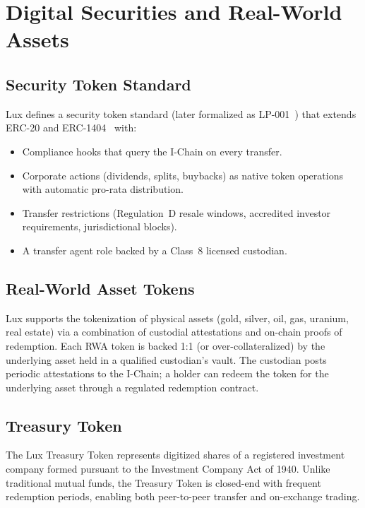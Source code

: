 \section{Digital Securities and Real-World Assets}


\subsection{Security Token Standard}

Lux defines a security token standard (later formalized as
LP-001~\cite{lp-001-securities}) that extends ERC-20 and
ERC-1404~\cite{erc1404} with:

\begin{itemize}[nosep]
  \item Compliance hooks that query the I-Chain on every transfer.
  \item Corporate actions (dividends, splits, buybacks) as native
        token operations with automatic pro-rata distribution.
  \item Transfer restrictions (Regulation~D resale windows, accredited
        investor requirements, jurisdictional blocks).
  \item A transfer agent role backed by a Class~8 licensed custodian.
\end{itemize}

\subsection{Real-World Asset Tokens}

Lux supports the tokenization of physical assets (gold, silver, oil,
gas, uranium, real estate) via a combination of custodial attestations
and on-chain proofs of redemption. Each RWA token is backed 1:1 (or
over-collateralized) by the underlying asset held in a qualified
custodian's vault. The custodian posts periodic attestations to the
I-Chain; a holder can redeem the token for the underlying asset
through a regulated redemption contract.

\subsection{Treasury Token}

The Lux Treasury Token represents digitized shares of a registered
investment company formed pursuant to the Investment Company Act
of 1940. Unlike traditional mutual funds, the Treasury Token is
closed-end with frequent redemption periods, enabling both
peer-to-peer transfer and on-exchange trading.

